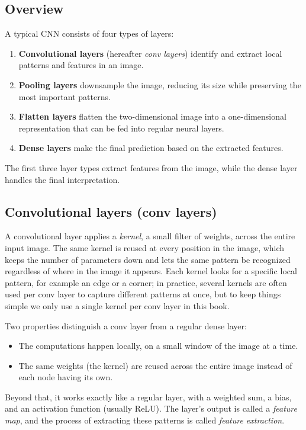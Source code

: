 \subsection{Overview}
A typical CNN consists of four types of layers:
\begin{enumerate}
  \item \textbf{Convolutional layers} (hereafter \emph{conv layers}) identify and extract local
    patterns and features in an image.
  \item \textbf{Pooling layers} downsample the image, reducing its size while preserving the most
    important patterns.
  \item \textbf{Flatten layers} flatten the two-dimensional image into a one-dimensional
    representation that can be fed into regular neural layers.
  \item \textbf{Dense layers} make the final prediction based on the extracted features.
\end{enumerate}
The first three layer types extract features from the image, while the dense layer handles the
final interpretation.

\subsection{Convolutional layers (conv layers)}
A convolutional layer applies a \emph{kernel}, a small filter of weights, across the entire input
image. The same kernel is reused at every position in the image, which keeps the number of
parameters down and lets the same pattern be recognized regardless of where in the image it
appears. Each kernel looks for a specific local pattern, for example an edge or a corner; in
practice, several kernels are often used per conv layer to capture different patterns at once,
but to keep things simple we only use a single kernel per conv layer in this book.

Two properties distinguish a conv layer from a regular dense layer:
\begin{itemize}
  \item The computations happen locally, on a small window of the image at a time.
  \item The same weights (the kernel) are reused across the entire image instead of each node
    having its own.
\end{itemize}
Beyond that, it works exactly like a regular layer, with a weighted sum, a bias, and an activation
function (usually ReLU). The layer's output is called a \emph{feature map}, and the process of
extracting these patterns is called \emph{feature extraction}.

